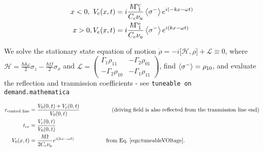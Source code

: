  {\[
 \begin{aligned}
 	x<0,\ V_c(x,t) & = i\frac{\hbar\Gamma_1^{c}}{C_c\nu_a}\left\langle \sigma^{-} \right\rangle e^{i(-kx-\omega t)}\\
  	x>0, V_e(x,t) & = i\frac{\hbar\Gamma_1^{e}}{C_e\nu_a}\left\langle \sigma^{-} \right\rangle e^{i(kx-\omega t)}\\
  	\end{aligned}
 \]}

 We solve the stationary state equation of motion $ \dot{\rho} = -i\big[\mathcal{H},\rho\big]+ \mathcal{L} \equiv 0 $, where $ \mathcal{H} = \frac{\hbar\delta\omega}{2}\sigma_z -\frac{\hbar\Omega}{2}\sigma_x$ and $ \mathcal{L} = \begin{pmatrix}
 	\Gamma_1\rho_{11} & -\Gamma_2\rho_{01}\\ -\Gamma_2\rho_{10} & -\Gamma_1\rho_{11}
 \end{pmatrix} $, find $ \left\langle \sigma^{-} \right\rangle = \rho_{10} $, and evaluate the reflection and tranmission coefficients - see \texttt{tuneable on demand.mathematica}
 
 \[
 	\begin{aligned}
	 	r_\text{control line} & = \frac{V_0(0,t) + V_c(0,t)}{V_0(0,t)} \hspace{2cm} \text{(driving field is also reflected from the tranmission line end)}\\
	 	t_{ce} & = \frac{V_e(0,t)}{V_0(0,t)}\\
	 	V_0(x,t) & = \frac{\hbar\Omega}{2C_c\nu_a}e^{i(kx-\omega t)} \hspace{2cm} \text{from Eq.~\eqref{eqn:tuneableVOltage}}.
 	\end{aligned}
 \]
 
 
